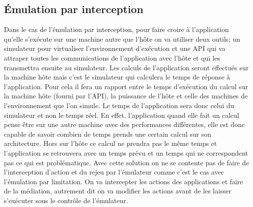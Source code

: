 \subsection{Émulation par interception}

Dans le cas de l'émulation par interception, pour faire croire à l'application
qu'elle s'exécute sur une machine autre que l'hôte on va utiliser deux outils;
un simulateur pour virtualiser l'environnement d'exécution et une API qui va
attraper toutes les communications de l'application avec l'hôte et qui les
transmettra ensuite au simulateur. Les calculs de l'application seront effectués
sur la machine hôte mais c'est le simulateur qui calculera le temps de réponse à
l'application. Pour cela il fera un rapport entre le temps d'exécution du calcul
sur la machine hôte (fourni par l'API), la puissance de l'hôte et celle des
machines de l'environnement que l'on simule. Le temps de l'application sera donc
celui du simulateur et non le temps réel. En effet, l'application quand elle
fait un calcul pense être sur une autre machine avec des performances
différentes, elle est donc capable de savoir combien de temps prends une certain
calcul sur son architecture. Hors sur l'hôte ce calcul ne prendra pas le même
temps et l'application se retrouvera avec un temps prévu et un temps qui ne
correspondent pas ce qui est problématique.  Avec cette solution on ne se
contente pas de faire de l'interception d'action et du rejeu par l'émulateur
comme c'est le cas avec l'émulation par limitation. On va intercepter les
actions des applications et faire de la médiation, autrement dit on va modifier
les actions avant de les laisser s'exécuter sous le contrôle de l'émulateur.

